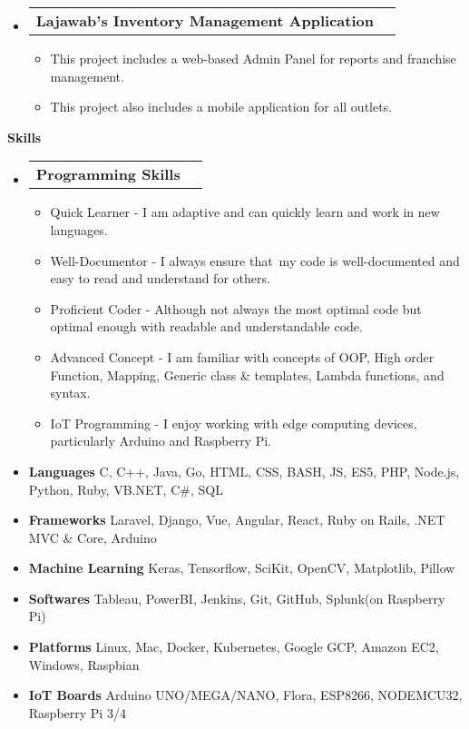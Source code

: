 \documentclass[letterpaper,12pt]{article}[leftmargin=*]
\makeatletter
\def \entryspacing {-0pt}
\renewcommand{\section}[2]{\vspace{5pt}
  \colorbox{secondary}{\color{white}\raggedbottom\normalsize\textbf{{#1}{\hspace{7pt}#2}}}
}
\newcommand{\resumeEntryStart}{\begin{itemize}[leftmargin=2.5mm]}
\newcommand{\resumeEntryEnd}{\end{itemize}\vspace{\entryspacing}}
\newcommand{\resumeItemListStart}{\begin{itemize}[leftmargin=4.5mm]}
\newcommand{\resumeItemListEnd}{\end{itemize}}
\newcommand{\resumeItem}[1]{
  \item\small{
    {#1 \vspace{-2pt}}
  }
}
\newcommand{\resumeEntryTD}[2]{
  \vspace{-1pt}\item[]
    \begin{tabularx}{0.97\textwidth}{X@{\hspace{60pt}}r}
      \textbf{\color{primary}#1} & {\firabook\color{accent}\small#2} \\
    \end{tabularx}\vspace{-6pt}
}
\newcommand{\resumeEntryS}[2]{
  \item[]\small{
    \textbf{\color{primary}#1 }{ #2 \vspace{-6pt}}
  }
}
\makeatother
\begin{document}
  \resumeEntryStart
    \resumeEntryTD
      {Lajawab's Inventory Management Application}{}
    \resumeItemListStart
      \resumeItem {This project includes a web-based Admin Panel for reports and franchise management.}
      \resumeItem {This project also includes a mobile application for all outlets.}
    \resumeItemListEnd
  \resumeEntryEnd


\section{\faGears}{Skills}
      \resumeEntryStart
        \resumeEntryTD
          {Programming Skills}{}
        \resumeItemListStart
          \resumeItem {Quick Learner - I am adaptive and can quickly learn and work in new languages.}
          \resumeItem {Well-Documentor - I always ensure that my code is well-documented and easy to read \linebreak and understand for others.}
          \resumeItem {Proficient Coder - Although not always the most optimal code but optimal enough with \linebreak readable and understandable code.}
          \resumeItem {Advanced Concept - I am familiar with concepts of OOP, High order Function, Mapping,\linebreak
           Generic class \& templates, Lambda functions, and syntax.}
          \resumeItem {IoT Programming - I enjoy working with edge computing devices, particularly Arduino \linebreak and Raspberry Pi.}
          \resumeItemListEnd
        \resumeEntryS{Languages} { C, C++, Java, Go, HTML, CSS, BASH, JS, ES5, PHP, Node.js, Python, Ruby, VB.NET, C\#, SQL}
        \resumeEntryS{Frameworks} {Laravel, Django, Vue, Angular, React, Ruby on Rails, .NET MVC \& Core, Arduino}
        \resumeEntryS{Machine Learning} {Keras, Tensorflow, SciKit, OpenCV, Matplotlib, Pillow}
        \resumeEntryS{Softwares} {Tableau, PowerBI, Jenkins, Git, GitHub, Splunk(on Raspberry Pi)}
        \resumeEntryS{Platforms} {Linux, Mac, Docker, Kubernetes, Google GCP, Amazon EC2, Windows, Raspbian}
        \resumeEntryS{IoT Boards} {Arduino UNO/MEGA/NANO, Flora, ESP8266, NODEMCU32, Raspberry Pi 3/4}
      
      \begin{flushright}
      \end{flushright}
  \resumeEntryEnd    
  
\end{document}
